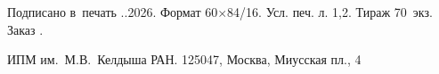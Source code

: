 \documentclass[a4paper,14pt,twoside,openany,article]{memoir} %
\begin{document}
\gappto\captionsrussian{} %


\mainmatter*                  %
\raggedbottom                 %

\par\vfill
\begingroup
\footnotesize
\noindent
{\centering
Подписано в~печать \blank[\widthof{00}].\blank[\widthof{00}].2026.
Формат 60\(\times\)84/16. Усл. печ. л. 1,2. Тираж 70~экз. Заказ .

ИПМ им.~М.В.~Келдыша РАН. 125047, Москва, Миусская пл., 4
\par}
\endgroup
\end{document}
